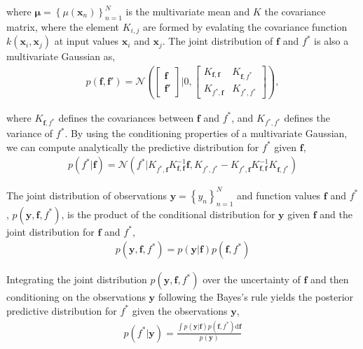 \documentclass[]{interact}
\theoremstyle{plain}%
\theoremstyle{definition}
\theoremstyle{remark}
\begin{document}
\noindent where $\boldsymbol{\mu} = \left\lbrace \mu(\mathbf{x}_n) \right\rbrace_{n=1}^N$ is the multivariate mean and $K$ the covariance matrix, where the element $K_{i,j}$ are formed by evalating the covariance function $k(\mathbf{x}_i,\mathbf{x}_j)$ at input values $\mathbf{x}_i$ and $\mathbf{x}_j$. The joint distribution of $\mathbf{f}$ and $f^*$ is also a multivariate Gaussian as,
%
\begin{eqnarray*}
p(\mathbf{f},\mathbf{f}')=\mathcal{N} \left( \left[ \begin{array}{cc}
\mathbf{f} \\ 
\mathbf{f}'
\end{array} \right] | 0,\left[ \begin{array}{cc}
K_{\mathbf{f},\mathbf{f}} & K_{\mathbf{f},f^*} \\ 
K_{f^*,\mathbf{f}} & K_{f^*,f^*}
\end{array} \right] \right),
\end{eqnarray*} 

\noindent where $K_{\mathbf{f},f^*}$ defines the covariances between $\mathbf{f}$ and $f^*$, and $K_{f^*,f^*}$ defines the variance of $f^*$. By using the conditioning properties of a multivariate Gaussian, we can compute analytically the predictive distribution for $f^*$  given $\mathbf{f}$,
\begin{align*}
	p(f^*| \mathbf{f}) = \mathcal{N}(f^*| K_{f^*,\mathbf{f}} K_{\mathbf{f},\mathbf{f}}^{-1} \mathbf{f},  K_{f^*,f^*}-K_{f^*,\mathbf{f}} K_{\mathbf{f},\mathbf{f}}^{-1} K_{\mathbf{f},f^*}  )
\end{align*}

The joint distribution of observations $\mathbf{y} = \left\lbrace y_n \right\rbrace_{n=1}^N$ and function values $\mathbf{f}$ and $f^*$, $p(\mathbf{y}, \mathbf{f}, f^*)$, is the product of the conditional distribution for $\mathbf{y}$ given $\mathbf{f}$ and the joint distribution for $\mathbf{f}$ and $f^*$,
\begin{align*}
	p(\mathbf{y}, \mathbf{f}, f^*) = p(\mathbf{y}|\mathbf{f})p(\mathbf{f}, f^*)
\end{align*}

Integrating the joint distribution  $p(\mathbf{y}, \mathbf{f}, f^*)$ over the uncertainty of $\mathbf{f}$ and then conditioning on the observations $\mathbf{y}$ following the Bayes's rule yields the posterior predictive distribution for $f^*$ given the observations $\mathbf{y}$,
%
\begin{align*}
	p(f^*|\mathbf{y}) = \frac{\int p(\mathbf{y}|\mathbf{f})p(\mathbf{f}, f^*)\text{d}\mathbf{f}}{p(\mathbf{y})}
\end{align*}
\end{document}
